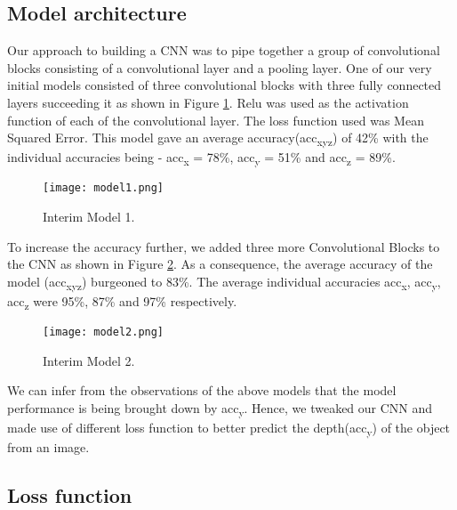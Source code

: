 \documentclass{article}
\begin{document}
\subsection{Model architecture}
Our approach to building a CNN was to pipe together a group of convolutional blocks consisting of a convolutional layer and a pooling layer. One of our very initial models consisted of three convolutional blocks with three fully connected layers succeeding it as shown in Figure \ref{fig:model1}. Relu was used as the activation function of each of the convolutional layer. The loss function used was Mean Squared Error. This model gave an average accuracy(acc\textsubscript{xyz}) of 42\% with the individual accuracies being - acc\textsubscript{x} = 78\%, acc\textsubscript{y} = 51\% and acc\textsubscript{z} = 89\%.

\begin{figure}[ht]
  \centering
  \texttt{[image: model1.png]}
  \caption{Interim Model 1.}
  \label{fig:model1}
\end{figure}

To increase the accuracy further, we added three more Convolutional Blocks to the CNN as shown in Figure \ref{fig:model2}. As a consequence, the average accuracy of the model (acc\textsubscript{xyz}) burgeoned to 83\%. The average individual accuracies acc\textsubscript{x}, acc\textsubscript{y}, acc\textsubscript{z} were 95\%, 87\% and 97\% respectively.

\begin{figure}[ht]
  \centering
  \texttt{[image: model2.png]}
  \caption{Interim Model 2.}
  \label{fig:model2}
\end{figure}

We can infer from the observations of the above models that the model performance is being brought down by acc\textsubscript{y}. Hence, we tweaked our CNN and made use of different loss function to better predict the depth(acc\textsubscript{y}) of the object from an image.

\subsection{Loss function}
\end{document}
